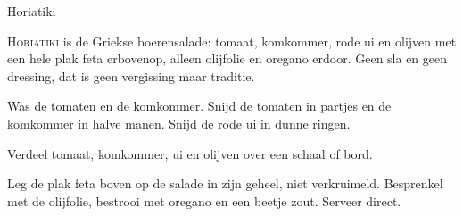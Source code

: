 \begin{recipe}{Horiatiki}
\label{recipe:horiatiki}


\lettrine{H}{oriatiki} is de Griekse boerensalade: tomaat, komkommer, rode ui en
olijven met een hele plak feta erbovenop, alleen olijfolie en oregano erdoor.
Geen sla en geen dressing, dat is geen vergissing maar traditie.

\begin{ingredients}
\end{ingredients}

\begin{steps}
  \item Was de tomaten en de komkommer. Snijd de tomaten in partjes en de
        komkommer in halve manen. Snijd de rode ui in dunne ringen.
  \item Verdeel tomaat, komkommer, ui en olijven over een schaal of bord.
  \item Leg de plak feta boven op de salade in zijn geheel, niet verkruimeld.
        Besprenkel met de olijfolie, bestrooi met oregano en een beetje zout.
        Serveer direct.
\end{steps}

\end{recipe}
